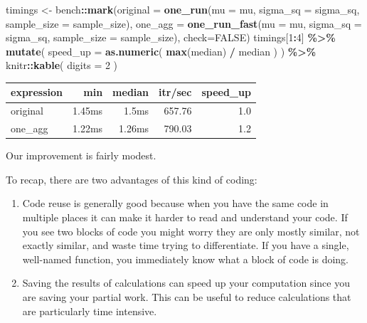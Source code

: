 \documentclass[
]{book}
\newenvironment{Shaded}{\begin{snugshade}}{\end{snugshade}}
\newcommand{\AttributeTok}[1]{\textcolor[rgb]{0.13,0.29,0.53}{#1}}
\newcommand{\ConstantTok}[1]{\textcolor[rgb]{0.56,0.35,0.01}{#1}}
\newcommand{\DecValTok}[1]{\textcolor[rgb]{0.00,0.00,0.81}{#1}}
\newcommand{\FunctionTok}[1]{\textcolor[rgb]{0.13,0.29,0.53}{\textbf{#1}}}
\newcommand{\NormalTok}[1]{#1}
\newcommand{\OtherTok}[1]{\textcolor[rgb]{0.56,0.35,0.01}{#1}}
\newcommand{\SpecialCharTok}[1]{\textcolor[rgb]{0.81,0.36,0.00}{\textbf{#1}}}
\begin{document}
\begin{Shaded}
\begin{Highlighting}[]
\NormalTok{timings }\OtherTok{\textless{}{-}}\NormalTok{ bench}\SpecialCharTok{::}\FunctionTok{mark}\NormalTok{(}\AttributeTok{original =} \FunctionTok{one\_run}\NormalTok{(}\AttributeTok{mu =}\NormalTok{ mu, }\AttributeTok{sigma\_sq =}\NormalTok{ sigma\_sq, }
                                          \AttributeTok{sample\_size =}\NormalTok{ sample\_size),}
                       \AttributeTok{one\_agg =} \FunctionTok{one\_run\_fast}\NormalTok{(}\AttributeTok{mu =}\NormalTok{ mu, }\AttributeTok{sigma\_sq =}\NormalTok{ sigma\_sq, }
                                              \AttributeTok{sample\_size =}\NormalTok{ sample\_size),}
                       \AttributeTok{check=}\ConstantTok{FALSE}\NormalTok{)}
\NormalTok{timings[}\DecValTok{1}\SpecialCharTok{:}\DecValTok{4}\NormalTok{] }\SpecialCharTok{\%\textgreater{}\%}
  \FunctionTok{mutate}\NormalTok{( }\AttributeTok{speed\_up =} \FunctionTok{as.numeric}\NormalTok{( }\FunctionTok{max}\NormalTok{(median) }\SpecialCharTok{/}\NormalTok{ median ) ) }\SpecialCharTok{\%\textgreater{}\%}
\NormalTok{  knitr}\SpecialCharTok{::}\FunctionTok{kable}\NormalTok{( }\AttributeTok{digits =} \DecValTok{2}\NormalTok{ )}
\end{Highlighting}
\end{Shaded}

\begin{tabular}{l|r|r|r|r}
\hline
expression & min & median & itr/sec & speed\_up\\
\hline
original & 1.45ms & 1.5ms & 657.76 & 1.0\\
\hline
one\_agg & 1.22ms & 1.26ms & 790.03 & 1.2\\
\hline
\end{tabular}

Our improvement is fairly modest.

To recap, there are two advantages of this kind of coding:

\begin{enumerate}
\def\labelenumi{\arabic{enumi}.}
\item
  Code reuse is generally good because when you have the same code in multiple places it can make it harder to read and understand your code. If you see two blocks of code you might worry they are only mostly similar, not exactly similar, and waste time trying to differentiate. If you have a single, well-named function, you immediately know what a block of code is doing.
\item
  Saving the results of calculations can speed up your computation since you are saving your partial work. This can be useful to reduce calculations that are particularly time intensive.
\end{enumerate}
\end{document}
